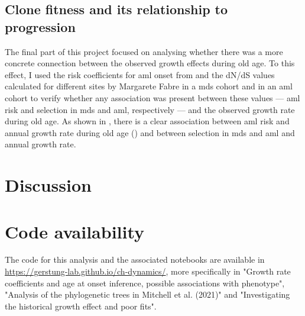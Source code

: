 \begin{figure}[!ht]
	\label{fig:ages-at-onset-benchmark}
\end{figure}

\subsection{Clone fitness and its relationship to progression}

The final part of this project focused on analysing whether there was a more concrete connection between the observed growth effects during old age. To this effect, I used the risk coefficients for \ac{aml} onset from \cite{Abelson2018-wh} and the dN/dS values calculated for different sites by Margarete Fabre in a \ac{mds} cohort and in an \ac{aml} cohort to verify whether any association was present between these values --- \ac{aml} risk and selection in \ac{mds} and \ac{aml}, respectively --- and the observed growth rate during old age. As shown in , there is a clear association between \ac{aml} risk and annual growth rate during old age () and between selection in \ac{mds} and \ac{aml} and annual growth rate.

\begin{figure}[!ht]
	\label{fig:ch-risk-selection}
\end{figure}

\FloatBarrier

\section{Discussion}



\section{Code availability}

The code for this analysis and the associated notebooks are available in \url{https://gerstung-lab.github.io/ch-dynamics/}, more specifically in "Growth rate coefficients and age at onset inference, possible associations with phenotype", "Analysis of the phylogenetic trees in Mitchell et al. (2021)" and "Investigating the historical growth effect and poor fits".